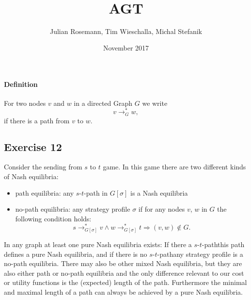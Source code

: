 \documentclass{article}
\title{AGT}
\author{Julian Rosemann, Tim Wieschalla, Michal Stefanik}
\date{November 2017}
\begin{document}
\maketitle

\newcommand{\PoA}{\textup{PoA}}
\newcommand{\PoS}{\textup{PoS}}

\newcommand{\NE}{\textup{NE}}

\newcommand{\maxl}[1]{\underset{#1}{\max\ }}
\newcommand{\minl}[1]{\underset{#1}{\min\ }}

\newcommand{\stpath}{$s$-$t$-path}
\newcommand{\lenshort}{|\text{shortest \stpath}|}
\newcommand{\lenlong}{|\text{longest \stpath}|}


\paragraph{Definition}
For two nodes $v$ and $w$ in a directed Graph $G$ we write
\[
    v \rightarrow^*_G w,
\]
if there is a path from $v$ to $w$.

\subsection*{Exercise 12}


Consider the sending from $s$ to $t$ game.
In this game there are two different kinds of Nash equilibria:
\begin{itemize}
    \item path equilibria: any $s$-$t$-path in $G[\sigma]$ is a Nash equilibria
    \item no-path equilibria: any strategy profile $\sigma$ if for any nodes $v$, $w$ in $G$ the following condition holds:
    \[
        s\rightarrow^*_{G[\sigma]} v \wedge w\rightarrow^*_{G[\sigma]} t \Rightarrow (v,w) \notin G.
    \]
\end{itemize}
In any graph at least one pure Nash equilibria exists:
If there a \stpath this path defines a pure Nash equilibria, and if there is no \stpath any strategy profile is a no-path equilibria.
There  may also be other mixed Nash equilibria, but they are also either path or no-path equilibria and the only difference relevant to our cost or utility functions is the (expected) length of the path.
Furthermore the minimal and maximal length of a path can always be achieved by a pure Nash equilibria.
\end{document}
